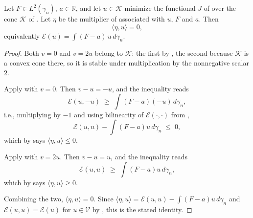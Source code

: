 \begin{lemma}
Let $F \in L^2(\gamma_n)$, $a \in \mathbb{R}$, and let $u \in \mathcal{K}$ minimize
the functional $J$ of  over the cone $\mathcal{K}$ of
.  Let $\eta$ be the multiplier of
 associated with $u$, $F$ and $a$.  Then
\[
  \langle \eta, u\rangle = 0 ,
\]
equivalently $\mathcal{E}(u) = \int (F-a)\,u\, d\gamma_n$.
\end{lemma}
\begin{proof}
Both $v = 0$ and $v = 2u$ belong to $\mathcal{K}$: the first by
, the second because $\mathcal{K}$ is a convex cone there,
so it is stable under multiplication by the nonnegative scalar $2$.

Apply  with $v = 0$.  Then $v - u = -u$, and the
inequality reads
\[
  \mathcal{E}(u, -u) \;\geq\; \int (F-a)(-u)\, d\gamma_n ,
\]
i.e., multiplying by $-1$ and using bilinearity of $\mathcal{E}(\cdot,\cdot)$
from ,
\[
  \mathcal{E}(u,u) - \int (F-a)u \, d\gamma_n \;\leq\; 0 ,
\]
which by  says $\langle\eta, u\rangle \leq 0$.

Apply  with $v = 2u$.  Then $v - u = u$, and the
inequality reads
\[
  \mathcal{E}(u, u) \;\geq\; \int (F-a)u\, d\gamma_n ,
\]
which by  says $\langle\eta, u\rangle \geq 0$.

Combining the two, $\langle\eta,u\rangle = 0$.  Since
$\langle\eta,u\rangle = \mathcal{E}(u,u) - \int(F-a)u\,d\gamma_n$ and
$\mathcal{E}(u,u) = \mathcal{E}(u)$ for $u \in \mathcal{V}$ by
, this is the stated identity.
\end{proof}

